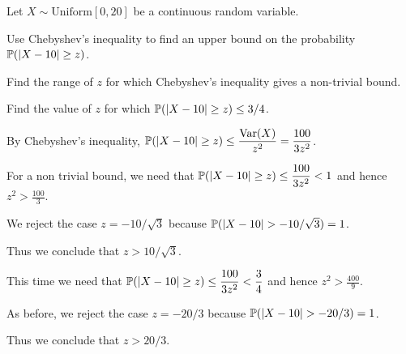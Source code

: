 \begin{exercise}
\begin{questions}
\question
Let $X\sim\text{Uniform}[0,20]$ be a continuous random variable.
\ben
\item Use Chebyshev's inequality to find an upper bound on the probability $\mathbb{P}(|X-10| \geq z)$. 
\item Find the range of $z$ for which Chebyshev's inequality gives a non-trivial bound. 
\item Find the value of $z$ for which $\mathbb{P}(|X-10|\geq z) \leq 3/4$.
\een
\begin{answer} %
\ben
\item 
By Chebyshev's inequality, $\displaystyle\mathbb{P}(|X-10|\geq z) \leq \frac{\text{Var}(X)}{z^2} = \frac{100}{3z^2}$.
\item 
For a non trivial bound, we need that 
$\displaystyle\mathbb{P}(|X-10|\geq z) \leq \frac{100}{3z^2} < 1$ and hence $\displaystyle z^2 > \frac{100}{3}$.

We reject the case $z=-10/\sqrt{3}$ because $\prob(|X-10|>-10/\sqrt{3})=1$.

Thus we conclude that $z>10/\sqrt{3}$.
\item 
This time we need that $\displaystyle\mathbb{P}(|X-10|\geq z) \leq \frac{100}{3z^2} < \frac{3}{4}$ and hence $\displaystyle z^2 > \frac{400}{9}$.

As before, we reject the case $z=-20/3$ because $\prob(|X-10|>-20/3)=1$.

Thus we conclude that $z>20/3$.
\een
\end{answer}





\end{questions}
\end{exercise}
